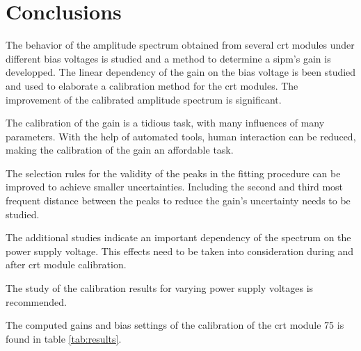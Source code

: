 \section{Conclusions}

The behavior of the amplitude spectrum obtained from several \gls{crt} modules under different bias voltages is studied and a method to determine a \gls{sipm}'s gain is developped.
The linear dependency of the gain on the bias voltage is been studied and used to elaborate a calibration method for the \gls{crt} modules.
The improvement of the calibrated amplitude spectrum is significant.

The calibration of the gain is a tidious task, with many influences of many parameters.
With the help of automated tools, human interaction can be reduced, making the calibration of the gain an affordable task.

The selection rules for the validity of the peaks in the fitting procedure can be improved to achieve smaller uncertainties.
Including the second and third most frequent distance between the peaks to reduce the gain's uncertainty needs to be studied.

The additional studies indicate an important dependency of the spectrum on the power supply voltage.
This effects need to be taken into consideration during and after \gls{crt} module calibration.

The study of the calibration results for varying power supply voltages is recommended.

The computed gains and bias settings of the calibration of the \gls{crt} module 75 is found in table \ref{tab:results}.


